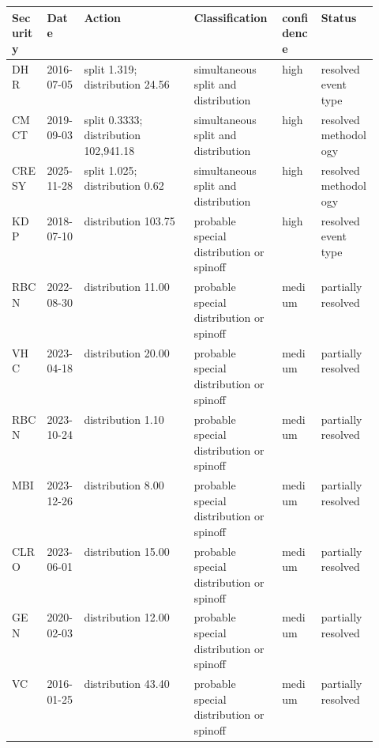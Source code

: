 {\small
\begin{tabular}{@{}llp{0.30\linewidth}p{0.24\linewidth}ll@{}}
\toprule
Security & Date & Action & Classification & confidence & Status \\
\midrule
DHR & 2016-07-05 & split 1.319; distribution 24.56 & simultaneous split and distribution & high & resolved event type \\
CMCT & 2019-09-03 & split 0.3333; distribution 102,941.18 & simultaneous split and distribution & high & resolved methodology \\
CRESY & 2025-11-28 & split 1.025; distribution 0.62 & simultaneous split and distribution & high & resolved methodology \\
KDP & 2018-07-10 & distribution 103.75 & probable special distribution or spinoff & high & resolved event type \\
RBCN & 2022-08-30 & distribution 11.00 & probable special distribution or spinoff & medium & partially resolved \\
VHC & 2023-04-18 & distribution 20.00 & probable special distribution or spinoff & medium & partially resolved \\
RBCN & 2023-10-24 & distribution 1.10 & probable special distribution or spinoff & medium & partially resolved \\
MBI & 2023-12-26 & distribution 8.00 & probable special distribution or spinoff & medium & partially resolved \\
CLRO & 2023-06-01 & distribution 15.00 & probable special distribution or spinoff & medium & partially resolved \\
GEN & 2020-02-03 & distribution 12.00 & probable special distribution or spinoff & medium & partially resolved \\
VC & 2016-01-25 & distribution 43.40 & probable special distribution or spinoff & medium & partially resolved \\
\bottomrule
\end{tabular}
}
